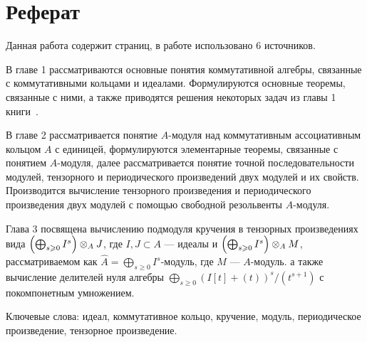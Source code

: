 \section*{Реферат}
    Данная работа содержит \pageref{LastPage} страниц, в работе использовано 6 источников.

    В главе 1 рассматриваются основные понятия коммутативной алгебры, связанные с коммутативными
    кольцами и идеалами. Формулируются основные теоремы, связанные с ними, а также приводятся 
    решения некоторых задач из главы 1 книги~\cite{A-M}. 

    В главе 2 рассматривается понятие $A$-модуля 
    над коммутативным ассоциативным кольцом $A$ с единицей, формулируются элементарные теоремы, связанные с понятием $A$-модуля, далее
    рассматривается понятие точной последовательности модулей, тензорного и периодического 
    произведений двух модулей и их свойств. Производится вычисление тензорного произведения 
    и периодического произведения двух модулей  с помощью свободной резольвенты $A$-модуля. 
    
    Глава 3 посвящена вычислению подмодуля кручения в тензорных произведениях вида 
    $\left(\bigoplus_{s \geqslant 0} I^s \right) \otimes_A J$, где $I, J \subset A$ --- идеалы и 
    $\left(\bigoplus_{s \geqslant 0} I^s \right) \otimes_A M$, рассматриваемом как $\hat A=\bigoplus_{s \ge 0} I^s$-модуль, 
    где $M$ --- $A$-модуль.
    а также вычисление делителей нуля алгебры 
    $\bigoplus_{s \geq 0}{(I[t] + (t))^s / (t^{s + 1})}$ с покомпонетным умножением.

    Ключевые слова: идеал,
    коммутативное кольцо,
    кручение,
    модуль,
    периодическое произведение,
    тензорное произведение.
    
